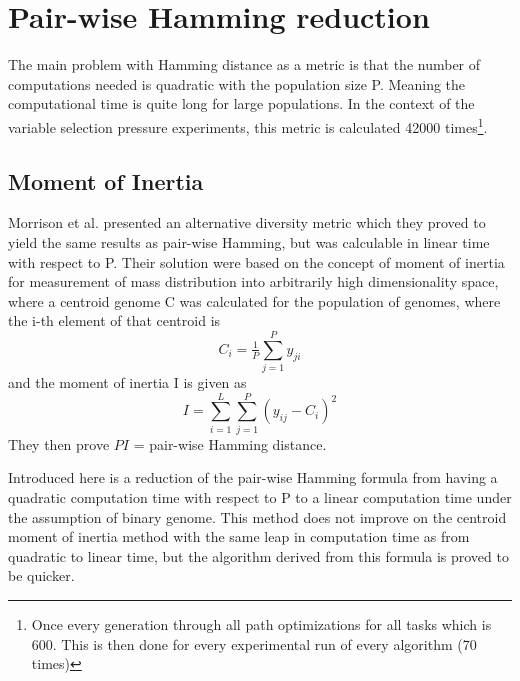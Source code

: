 \chapter{Pair-wise Hamming reduction}
\label{appendix:Hammingreduction}
The main problem with Hamming distance as a metric is that the number of computations needed is quadratic with the population size P. Meaning the computational time is quite long for large populations. In the context of the variable selection pressure experiments, this metric is calculated 42000 times\footnote{Once every generation through all path optimizations for all tasks which is 600. This is then done for every experimental run of every algorithm (70 times)}.

\section{Moment of Inertia}
Morrison et al. presented\cite{populationDiversity} an alternative diversity metric which they proved to yield the same results as pair-wise Hamming, but was calculable in linear time with respect to P. Their solution were based on the concept of moment of inertia for measurement of mass distribution into arbitrarily high dimensionality space, where a centroid genome C was calculated for the population of genomes, where the i-th element of that centroid is
\begin{equation}
    \label{eq:centroid}
    C_{i}=\tfrac{1}{P}\sum_{j=1}^{P}y_{ji}
\end{equation}
and the moment of inertia I is given as 
\begin{equation}
    \label{eq:Inertiadiversity}
    I  = \sum_{i=1}^{L}\sum_{j=1}^{P}\left ( y_{ij}-C_{i} \right )^{2}
\end{equation}
They then prove \(PI\) = pair-wise Hamming distance.

Introduced here is a reduction of the pair-wise Hamming formula from having a quadratic computation time with respect to P to a linear computation time under the assumption of binary genome. This method does not improve on the centroid moment of inertia method with the same leap in computation time as from quadratic to linear time, but the algorithm derived from this formula is proved to be quicker. 

